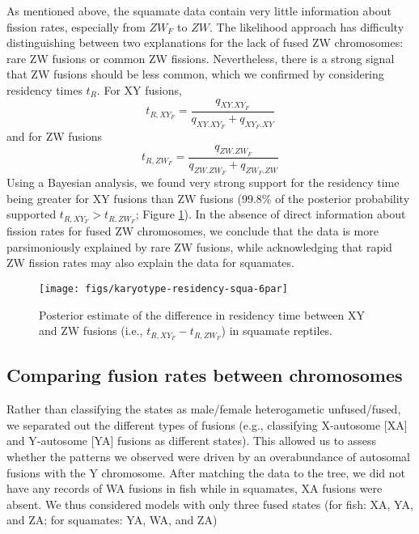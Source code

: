 As mentioned above, the squamate data contain very little information about fission rates, especially from $ZW_F$ to $ZW$. The likelihood approach has difficulty distinguishing between two explanations for the lack of fused ZW chromosomes: rare ZW fusions or common ZW fissions. Nevertheless, there is a strong signal that ZW fusions should be less common, which we confirmed by considering residency times $t_R$. For XY fusions,
\begin{equation}
t_{R,XY_F} = \frac{q_{XY.XY_F}}{q_{XY.XY_F} + q_{XY_F.XY}}
\end{equation}
and for ZW fusions
\begin{equation}
t_{R,ZW_F} = \frac{q_{ZW.ZW_F}}{q_{ZW.ZW_F} + q_{ZW_F.ZW}}
\end{equation}
Using a Bayesian analysis, we found very strong support for the residency time being greater for XY fusions than ZW fusions (99.8\% of the posterior probability supported $t_{R,XY_F} > t_{R,ZW_F}$; Figure \ref{fig:squa-resid}). In the absence of direct information about fission rates for fused ZW chromosomes, we conclude that the data is more parsimoniously explained by rare ZW fusions, while acknowledging that rapid ZW fission rates may also explain the data for squamates.

\begin{figure}[p]
\centering
\texttt{[image: figs/karyotype-residency-squa-6par]}
\caption[Posterior estimate of fusion residency time in squamates]{Posterior estimate of the difference in residency time between XY and ZW fusions (i.e., $t_{R,XY_F} - t_{R,ZW_F}$) in squamate reptiles.}
\label{fig:squa-resid}
\end{figure}


\subsection{Comparing fusion rates between chromosomes} 

Rather than classifying the states as male/female heterogametic unfused/fused, we separated out the different types of fusions (e.g., classifying X-autosome [XA] and Y-autosome [YA] fusions as different states). This allowed us to assess whether the patterns we observed were driven by an overabundance of autosomal fusions with the Y chromosome. After matching the data to the tree, we did not have any records of WA fusions in fish while in squamates, XA fusions were absent. We thus considered models with only three fused states (for fish: XA, YA, and ZA; for squamates: YA, WA, and ZA)

